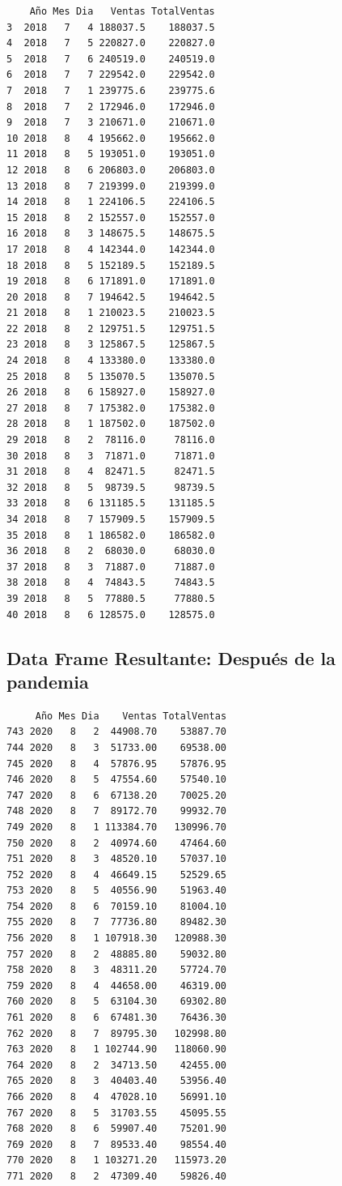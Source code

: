 \documentclass[
  us-letterpaper,
]{scrreprt}
\theoremstyle{plain}
\theoremstyle{plain}
\theoremstyle{definition}
\theoremstyle{remark}
\begin{document}
\begin{verbatim}
    Año Mes Dia   Ventas TotalVentas
3  2018   7   4 188037.5    188037.5
4  2018   7   5 220827.0    220827.0
5  2018   7   6 240519.0    240519.0
6  2018   7   7 229542.0    229542.0
7  2018   7   1 239775.6    239775.6
8  2018   7   2 172946.0    172946.0
9  2018   7   3 210671.0    210671.0
10 2018   8   4 195662.0    195662.0
11 2018   8   5 193051.0    193051.0
12 2018   8   6 206803.0    206803.0
13 2018   8   7 219399.0    219399.0
14 2018   8   1 224106.5    224106.5
15 2018   8   2 152557.0    152557.0
16 2018   8   3 148675.5    148675.5
17 2018   8   4 142344.0    142344.0
18 2018   8   5 152189.5    152189.5
19 2018   8   6 171891.0    171891.0
20 2018   8   7 194642.5    194642.5
21 2018   8   1 210023.5    210023.5
22 2018   8   2 129751.5    129751.5
23 2018   8   3 125867.5    125867.5
24 2018   8   4 133380.0    133380.0
25 2018   8   5 135070.5    135070.5
26 2018   8   6 158927.0    158927.0
27 2018   8   7 175382.0    175382.0
28 2018   8   1 187502.0    187502.0
29 2018   8   2  78116.0     78116.0
30 2018   8   3  71871.0     71871.0
31 2018   8   4  82471.5     82471.5
32 2018   8   5  98739.5     98739.5
33 2018   8   6 131185.5    131185.5
34 2018   8   7 157909.5    157909.5
35 2018   8   1 186582.0    186582.0
36 2018   8   2  68030.0     68030.0
37 2018   8   3  71887.0     71887.0
38 2018   8   4  74843.5     74843.5
39 2018   8   5  77880.5     77880.5
40 2018   8   6 128575.0    128575.0
\end{verbatim}

\subsection{Data Frame Resultante: Después de la
pandemia}\label{data-frame-resultante-despuuxe9s-de-la-pandemia}

\begin{verbatim}
     Año Mes Dia    Ventas TotalVentas
743 2020   8   2  44908.70    53887.70
744 2020   8   3  51733.00    69538.00
745 2020   8   4  57876.95    57876.95
746 2020   8   5  47554.60    57540.10
747 2020   8   6  67138.20    70025.20
748 2020   8   7  89172.70    99932.70
749 2020   8   1 113384.70   130996.70
750 2020   8   2  40974.60    47464.60
751 2020   8   3  48520.10    57037.10
752 2020   8   4  46649.15    52529.65
753 2020   8   5  40556.90    51963.40
754 2020   8   6  70159.10    81004.10
755 2020   8   7  77736.80    89482.30
756 2020   8   1 107918.30   120988.30
757 2020   8   2  48885.80    59032.80
758 2020   8   3  48311.20    57724.70
759 2020   8   4  44658.00    46319.00
760 2020   8   5  63104.30    69302.80
761 2020   8   6  67481.30    76436.30
762 2020   8   7  89795.30   102998.80
763 2020   8   1 102744.90   118060.90
764 2020   8   2  34713.50    42455.00
765 2020   8   3  40403.40    53956.40
766 2020   8   4  47028.10    56991.10
767 2020   8   5  31703.55    45095.55
768 2020   8   6  59907.40    75201.90
769 2020   8   7  89533.40    98554.40
770 2020   8   1 103271.20   115973.20
771 2020   8   2  47309.40    59826.40
\end{verbatim}
\end{document}

